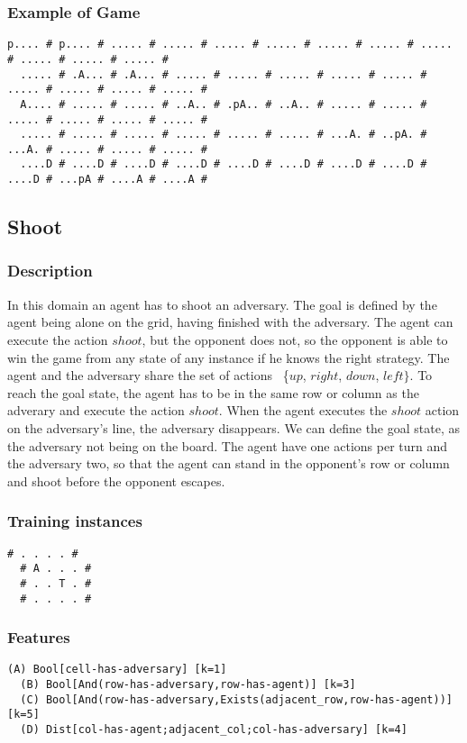 \documentclass[a4paper]{article}
\begin{document}
\subsubsection{Example of Game}
\begin{Verbatim}[fontsize=\footnotesize]
  p.... # p.... # ..... # ..... # ..... # ..... # ..... # ..... # ..... # ..... # ..... # ..... #
  ..... # .A... # .A... # ..... # ..... # ..... # ..... # ..... # ..... # ..... # ..... # ..... #
  A.... # ..... # ..... # ..A.. # .pA.. # ..A.. # ..... # ..... # ..... # ..... # ..... # ..... #
  ..... # ..... # ..... # ..... # ..... # ..... # ...A. # ..pA. # ...A. # ..... # ..... # ..... #
  ....D # ....D # ....D # ....D # ....D # ....D # ....D # ....D # ....D # ...pA # ....A # ....A #
\end{Verbatim}

\subsection{Shoot}
\subsubsection{Description}
In this domain an agent has to shoot an adversary. The goal is defined by the agent being alone on the grid, having finished with the adversary. The agent can execute the action $shoot$, but the opponent does not, so the opponent is able to win the game from any state of any instance if he knows the right strategy. The agent and the adversary share the set of actions ~\{$up$, $right$, $down$, $left\}$. To reach the goal state, the agent has to be in the same row or column as the adverary and execute the action $shoot$. When the agent executes the $shoot$ action on the adversary's line, the adversary disappears. We can define the goal state, as the adversary not being on the board. The agent have one actions per turn and the adversary two, so that the agent can stand in the opponent's row or column and shoot before the opponent escapes.

\subsubsection{Training instances}
\begin{Verbatim}[fontsize=\footnotesize]
  # . . . . #
  # A . . . #
  # . . T . #
  # . . . . #
\end{Verbatim}

\subsubsection{Features}
\begin{Verbatim}[fontsize=\footnotesize]
  (A) Bool[cell-has-adversary] [k=1]
  (B) Bool[And(row-has-adversary,row-has-agent)] [k=3]
  (C) Bool[And(row-has-adversary,Exists(adjacent_row,row-has-agent))] [k=5]
  (D) Dist[col-has-agent;adjacent_col;col-has-adversary] [k=4]
\end{Verbatim}
\end{document}

